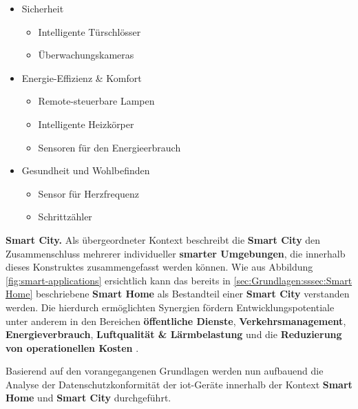 \begin{itemize}
	\item Sicherheit
		\begin{itemize}
			\item Intelligente Türschlösser
			\item Überwachungskameras
		\end{itemize}
	\item Energie-Effizienz \& Komfort
		\begin{itemize}
			\item Remote-steuerbare Lampen
			\item Intelligente Heizkörper
			\item Sensoren für den Energieerbrauch
		\end{itemize}
	\item Gesundheit und Wohlbefinden
		\begin{itemize}
			\item Sensor für Herzfrequenz
			\item Schrittzähler
		\end{itemize}
\end{itemize}


\noindent \textbf{Smart City.}
Als übergeordneter Kontext beschreibt die \textbf{Smart City} den Zusammenschluss mehrerer individueller \textbf{smarter Umgebungen}, die innerhalb dieses Konstruktes zusammengefasst werden können. Wie aus Abbildung \ref{fig:smart-applications} ersichtlich kann das bereits in  \ref{sec:Grundlagen:sssec:Smart Home} beschriebene \textbf{Smart Home} als Bestandteil einer \textbf{Smart City} verstanden werden. Die hierdurch ermöglichten Synergien fördern Entwicklungspotentiale unter anderem in den Bereichen \textbf{öffentliche Dienste}, \textbf{Verkehrsmanagement}, \textbf{Energieverbrauch}, \textbf{Luftqualität \& Lärmbelastung} und die \textbf{Reduzierung von operationellen Kosten} \cite{Bastos2018}.

Basierend auf den vorangegangenen Grundlagen werden nun aufbauend die Analyse der Datenschutzkonformität der \ac{iot}-Geräte innerhalb der Kontext \textbf{Smart Home} und \textbf{Smart City} durchgeführt.
